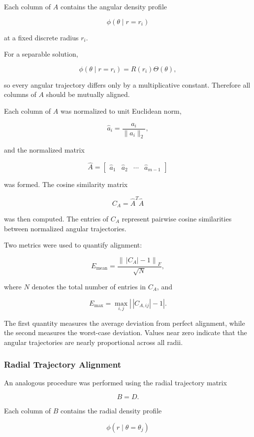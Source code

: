 \documentclass{article}
\begin{document}
Each column of \(A\) contains the angular density profile

\[
\phi(\theta \mid r=r_i)
\]

at a fixed discrete radius \(r_i\).

For a separable solution,

\[
\phi(\theta \mid r=r_i)
=
R(r_i)\Theta(\theta),
\]

so every angular trajectory differs only by a multiplicative constant. Therefore all columns of \(A\) should be mutually aligned.

Each column of \(A\) was normalized to unit Euclidean norm,

\[
\widehat{a}_i
=
\frac{a_i}{\|a_i\|_2},
\]

and the normalized matrix

\[
\widehat{A}
=
\begin{bmatrix}
\widehat{a}_1 &
\widehat{a}_2 &
\cdots &
\widehat{a}_{m-1}
\end{bmatrix}
\]

was formed. The cosine similarity matrix

\[
C_A
=
\widehat{A}^{T}\widehat{A}
\]

was then computed. The entries of \(C_A\) represent pairwise cosine similarities between normalized angular trajectories.

Two metrics were used to quantify alignment:

\[
E_{\mathrm{mean}}
=
\frac{
\left\|
\,|C_A|-1
\right\|_F
}
{\sqrt{N}},
\]

where \(N\) denotes the total number of entries in \(C_A\), and

\[
E_{\mathrm{max}}
=
\max_{i,j}
\left|
\,|C_{A,ij}|-1
\right|.
\]

The first quantity measures the average deviation from perfect alignment, while the second measures the worst-case deviation. Values near zero indicate that the angular trajectories are nearly proportional across all radii.

\subsubsection{Radial Trajectory Alignment}

An analogous procedure was performed using the radial trajectory matrix

\[
B=D.
\]

Each column of \(B\) contains the radial density profile

\[
\phi(r \mid \theta=\theta_j)
\]
\end{document}
